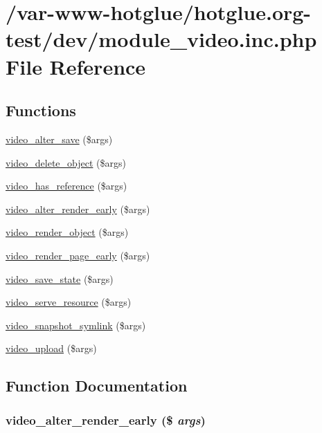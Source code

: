 \hypertarget{module__video_8inc_8php}{
\section{/var-\/www-\/hotglue/hotglue.org-\/test/dev/module\_\-video.inc.php File Reference}
\label{module__video_8inc_8php}
}
\subsection*{Functions}
\begin{DoxyCompactItemize}
\item 
\hyperlink{module__video_8inc_8php_a0e3433d55c8d20b28c95a757740982e1}{video\_\-alter\_\-save} (\$args)
\item 
\hyperlink{module__video_8inc_8php_a4d25a132251840ed2ade27b636a6694e}{video\_\-delete\_\-object} (\$args)
\item 
\hyperlink{module__video_8inc_8php_adbbede5e492ca7b9457deaf076c887b0}{video\_\-has\_\-reference} (\$args)
\item 
\hyperlink{module__video_8inc_8php_acb94c1f22db7bb3aada14237fa83f4dd}{video\_\-alter\_\-render\_\-early} (\$args)
\item 
\hyperlink{module__video_8inc_8php_a14d6bc200a41905ad201a24d9a2d9be5}{video\_\-render\_\-object} (\$args)
\item 
\hyperlink{module__video_8inc_8php_a223ac9bac4acfb2c9b458b43e45e06e3}{video\_\-render\_\-page\_\-early} (\$args)
\item 
\hyperlink{module__video_8inc_8php_a828b4f740b870b886936a22baf97418e}{video\_\-save\_\-state} (\$args)
\item 
\hyperlink{module__video_8inc_8php_a5af838d3c4206bbc9bc3b5e57b16655c}{video\_\-serve\_\-resource} (\$args)
\item 
\hyperlink{module__video_8inc_8php_a53066561348413ee1021d257ae724983}{video\_\-snapshot\_\-symlink} (\$args)
\item 
\hyperlink{module__video_8inc_8php_a6ab50ffd184d8dcf84a9783dd6a2f80e}{video\_\-upload} (\$args)
\end{DoxyCompactItemize}


\subsection{Function Documentation}
\hypertarget{module__video_8inc_8php_acb94c1f22db7bb3aada14237fa83f4dd}{
\subsubsection[{video\_\-alter\_\-render\_\-early}]{\setlength{\rightskip}{0pt plus 5cm}video\_\-alter\_\-render\_\-early (\$ {\em args})}}
\label{module__video_8inc_8php_acb94c1f22db7bb3aada14237fa83f4dd}


